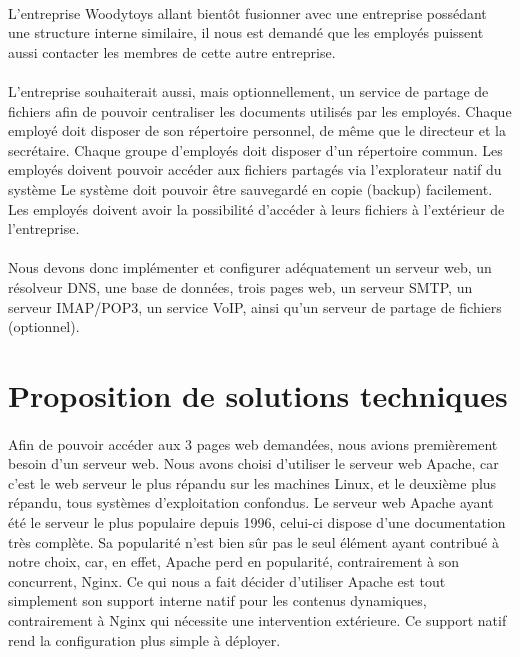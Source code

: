 \documentclass[a4paper,12pt]{article}
\begin{document}
	\paragraph{} L’entreprise Woodytoys allant bientôt fusionner avec une entreprise possédant
une structure interne similaire, il nous est demandé que les employés puissent aussi
contacter les membres de cette autre entreprise.
	\paragraph{}L’entreprise souhaiterait aussi, mais optionnellement, un service de partage de
fichiers afin de pouvoir centraliser les documents utilisés par les employés.
Chaque employé doit disposer de son répertoire personnel, de même que le directeur
et la secrétaire.
Chaque groupe d’employés doit disposer d’un répertoire commun.
Les employés doivent pouvoir accéder aux fichiers partagés via l’explorateur natif
du système
Le système doit pouvoir être sauvegardé en copie (backup) facilement.
Les employés doivent avoir la possibilité d’accéder à leurs fichiers à l’extérieur de
l’entreprise.
	\paragraph{}Nous devons donc implémenter et configurer adéquatement un serveur web, un
résolveur DNS, une base de données, trois pages web, un serveur SMTP, un serveur
IMAP/POP3, un service VoIP, ainsi qu’un serveur de partage de fichiers (optionnel).	
	
	
\section{Proposition de solutions techniques}
	\paragraph{} Afin de pouvoir accéder aux 3 pages web demandées, nous avions premièrement
besoin d’un serveur web. Nous avons choisi d’utiliser le serveur web Apache, car c’est
le web serveur le plus répandu sur les machines Linux, et le deuxième plus répandu,
tous systèmes d’exploitation confondus. Le serveur web Apache ayant été le serveur
le plus populaire depuis 1996, celui-ci dispose d’une documentation très complète.
Sa popularité n’est bien sûr pas le seul élément ayant contribué à notre choix, car,
en effet, Apache perd en popularité, contrairement à son concurrent, Nginx. Ce qui
nous a fait décider d’utiliser Apache est tout simplement son support interne natif
pour les contenus dynamiques, contrairement à Nginx qui nécessite une intervention
extérieure. Ce support natif rend la configuration plus simple à déployer.
\end{document}
